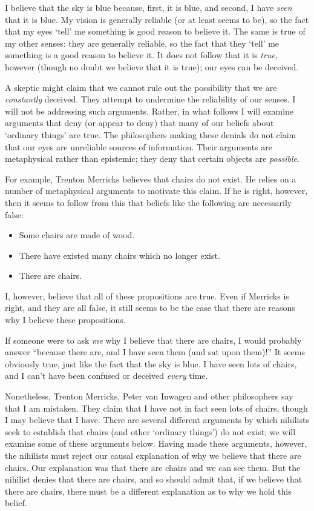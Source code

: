 \documentclass[11pt]{article}
\begin{document}
\begin{spacing}{1.5}
I believe that the sky is blue because, first, it is blue, and second,
I have {\em seen} that it is blue.  My vision is generally reliable
(or at least seems to be), so the fact that my eyes `tell' me
something is good reason to believe it.  The same is true of my other
senses: they are generally reliable, so the fact that they `tell' me
something is a good reason to believe it.  It does not follow that it
is {\em true}, however (though no doubt we believe that it is true);
our eyes can be deceived.

A skeptic might claim that we cannot rule out the possibility that we
are {\em constantly} deceived.  They attempt to undermine the
reliability of our senses.  I will not be addressing such arguments.
Rather, in what follows I will examine arguments that deny (or appear
to deny) that many of our beliefs about `ordinary things' are true.
The philosophers making these denials do not claim that our eyes are
unreliable sources of information.  Their arguments are metaphysical
rather than epistemic; they deny that certain objects are {\em
  possible}.  

For example, Trenton Merricks believes that chairs do not exist.  He
relies on a number of metaphysical arguments to motivate this claim.
If he is right, however, then it seems to follow from this that
beliefs like the following are necessarily false:

\begin{itemize}
  \item Some chairs are made of wood.
  \item There have existed many chairs which no longer exist.
  \item There are chairs.
\end{itemize}

I, however, believe that all of these propositions are true.  Even if
Merricks is right, and they are all false, it still seems to be the
case that there are reasons why I believe these propositions.

If someone were to ask {\em me} why I believe that there are chairs, I
would probably answer ``because there are, and I have seen them (and
sat upon them)!''  It seems obviously true, just like the fact that
the sky is blue.  I have seen lots of chairs, and I can't have been
confused or deceived {\em every} time.

Nonetheless, Trenton Merricks, Peter van Inwagen and other
philosophers say that I am mistaken.  They claim that I have not in
fact seen lots of chairs, though I may believe that I have.  There are
several different arguments by which nihilists seek to establish that
chairs (and other `ordinary things') do not exist; we will examine
some of these arguments below.  Having made these arguments, however,
the nihilists must reject our causal explanation of why we believe
that there are chairs.  Our explanation was that there are chairs and
we can see them.  But the nihilist denies that there are chairs, and
so should admit that, if we believe that there are chairs, there must
be a different explanation as to why we hold this belief.


\end{spacing}
\end{document}
